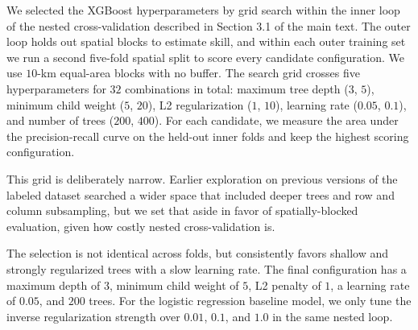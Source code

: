 \documentclass[../main.tex]{subfiles}
\begin{document}
We selected the XGBoost hyperparameters by grid search within the inner loop of the nested cross-validation described in Section 3.1 of the main text. The outer loop holds out spatial blocks to estimate skill, and within each outer training set we run a second five-fold spatial split to score every candidate configuration. We use $10$-km equal-area blocks with no buffer. The search grid crosses five hyperparameters for $32$ combinations in total: maximum tree depth ($3$, $5$), minimum child weight ($5$, $20$), L2 regularization ($1$, $10$), learning rate ($0.05$, $0.1$), and number of trees ($200$, $400$). For each candidate, we measure the area under the precision-recall curve on the held-out inner folds and keep the highest scoring configuration.

This grid is deliberately narrow. Earlier exploration on previous versions of the labeled dataset searched a wider space that included deeper trees and row and column subsampling, but we set that aside in favor of spatially-blocked evaluation, given how costly nested cross-validation is.

The selection is not identical across folds, but consistently favors shallow and strongly regularized trees with a slow learning rate. The final configuration has a maximum depth of $3$, minimum child weight of $5$, L2 penalty of $1$, a learning rate of $0.05$, and $200$ trees. For the logistic regression baseline model, we only tune the inverse regularization strength over $0.01$, $0.1$, and $1.0$ in the same nested loop.
\end{document}
